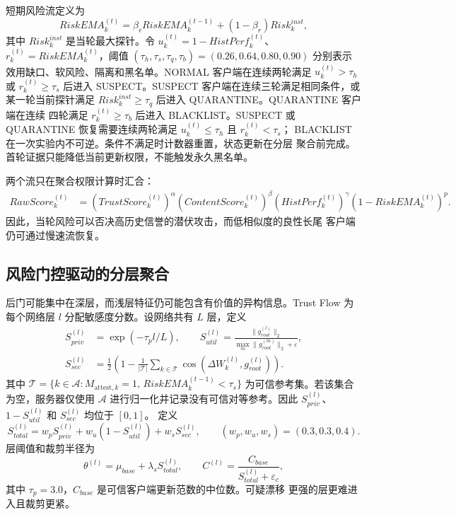 \documentclass[11pt, a4paper, UTF8, fontset=fandol]{ctexart}
\begin{document}
短期风险流定义为
\begin{equation}
    RiskEMA_k^{(t)}=\beta_rRiskEMA_k^{(t-1)}
    +(1-\beta_r)Risk_k^{inst},
\end{equation}
其中 $Risk_k^{inst}$ 是当轮最大探针。令
$u_k^{(t)}=1-HistPerf_k^{(t)}$、$r_k^{(t)}=RiskEMA_k^{(t)}$，阈值
$(\tau_h,\tau_s,\tau_q,\tau_b)=(0.26,0.64,0.80,0.90)$
分别表示效用缺口、软风险、隔离和黑名单。NORMAL 客户端在连续两轮满足
$u_k^{(t)}>\tau_h$ 或 $r_k^{(t)}\geq\tau_s$ 后进入 SUSPECT。SUSPECT
客户端在连续三轮满足相同条件，或某一轮当前探针满足
$Risk_k^{inst}\geq\tau_q$ 后进入 QUARANTINE。QUARANTINE 客户端在连续
四轮满足 $r_k^{(t)}\geq\tau_b$ 后进入 BLACKLIST。SUSPECT 或 QUARANTINE
恢复需要连续两轮满足 $u_k^{(t)}\leq\tau_h$ 且 $r_k^{(t)}<\tau_s$；
BLACKLIST 在一次实验内不可逆。条件不满足时计数器重置，状态更新在分层
聚合前完成。首轮证据只能降低当前更新权限，不能触发永久黑名单。

两个流只在聚合权限计算时汇合：
\begin{align}
    RawScore_k^{(t)} &=(TrustScore_k^{(t)})^\alpha
    (ContentScore_k^{(t)})^\beta(HistPerf_k^{(t)})^\gamma
    (1-RiskEMA_k^{(t)})^p .
\end{align}
因此，当轮风险可以否决高历史信誉的潜伏攻击，而低相似度的良性长尾
客户端仍可通过慢速流恢复。

\subsection{风险门控驱动的分层聚合}
后门可能集中在深层，而浅层特征仍可能包含有价值的异构信息。Trust
Flow 为每个网络层 $l$ 分配敏感度分数。设网络共有 $L$ 层，定义
\begin{align}
    S_{priv}^{(l)}&=\exp(-\tau_p l/L),\qquad
    S_{util}^{(l)}=\frac{\|g_{root}^{(l)}\|_2}
    {\max_m\|g_{root}^{(m)}\|_2+\varepsilon},\\
    S_{sec}^{(l)}&=\frac{1}{2}\left(1-\frac{1}{|\mathcal{T}|}
    \sum_{k\in\mathcal{T}}\cos(\Delta W_k^{(l)},g_{root}^{(l)})\right).
\end{align}
其中
$\mathcal{T}=\{k\in\mathcal{A}:M_{\mathrm{attest},k}=1,\,
RiskEMA_k^{(t-1)}<\tau_s\}$ 为可信参考集。若该集合为空，服务器仅使用
$\mathcal{A}$ 进行归一化并记录没有可信对等参考。因此
$S_{priv}^{(l)}$、$1-S_{util}^{(l)}$ 和 $S_{sec}^{(l)}$ 均位于 $[0,1]$。
定义
\begin{equation}
    S_{total}^{(l)}=w_pS_{priv}^{(l)}+w_u(1-S_{util}^{(l)})
    +w_sS_{sec}^{(l)},\qquad (w_p,w_u,w_s)=(0.3,0.3,0.4).
\end{equation}
层阈值和裁剪半径为
\begin{equation}
    \theta^{(l)}=\mu_{base}+\lambda_sS_{total}^{(l)},\qquad
    C^{(l)}=\frac{C_{base}}{S_{total}^{(l)}+\varepsilon_c},
\end{equation}
其中 $\tau_p=3.0$，$C_{base}$ 是可信客户端更新范数的中位数。可疑漂移
更强的层更难进入且裁剪更紧。
\end{document}
